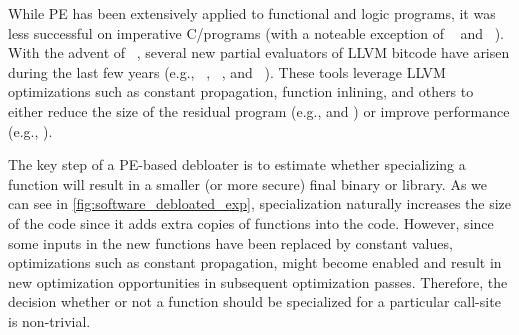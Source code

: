 %
%
While PE has been extensively applied to functional and logic programs, it was
less successful on imperative C/\cpp programs (with a noteable exception of
\cmix~\cite{Andersen94} and \tempo~\cite{Consel98}). With the advent of
\llvm~\cite{llvm}, several new partial evaluators of LLVM bitcode have arisen
during the last few years (e.g., \llpe~\cite{llpe}, \occam~\cite{occam}, and
\trimmer~\cite{trimmer}). These tools leverage LLVM optimizations such as
constant propagation, function inlining, and others to either reduce the size of
the residual program (e.g., \occam and \trimmer) or improve performance (e.g.,
\llpe).

The key step of a PE-based debloater is to estimate whether specializing a function will result in a smaller (or more secure) final binary or library.
As we can see in \cref{fig:software_debloated_exp}, specialization naturally increases the size of the code since it adds extra copies of functions into the code. However, since some inputs in the new functions have been replaced by constant values, optimizations such as constant propagation, might become enabled and result in new optimization opportunities in subsequent optimization passes. Therefore, the decision whether or not a function should be specialized for a particular call-site is non-trivial.